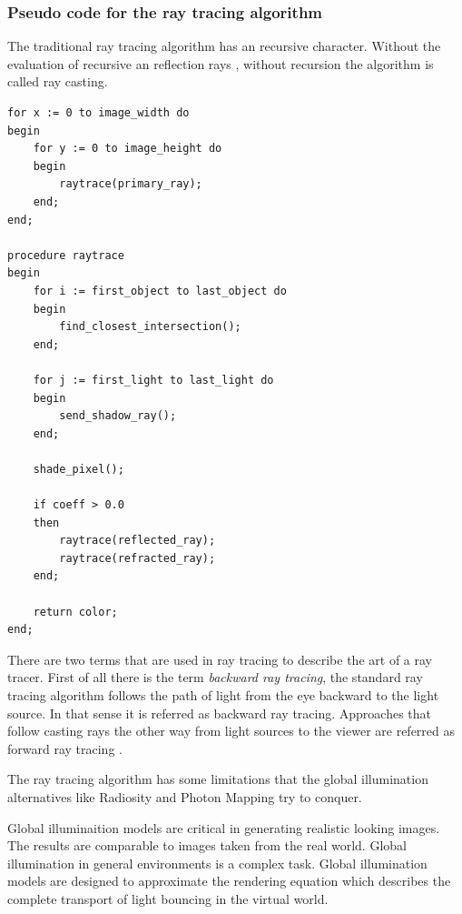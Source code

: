 \documentclass[DIV10, abstracton, openright, footsepline, headsepline, twoside, 9pt,
bigheadings]{scrreprt}
\begin{document}
\subsubsection*{Pseudo code for the ray tracing algorithm}
The traditional ray tracing algorithm has an recursive character. Without
the evaluation of recursive an reflection rays , without recursion the
algorithm is called ray casting.
\lstset{
        basicstyle=\ttfamily,
        tabsize=8,
        language=Pascal,
        numberstyle=\tiny,
        numbers=right,
        numbersep=5pt,
        stepnumber=1,
        extendedchars=true,
	basicstyle=\small
}
\begin{lstlisting}[caption=Ray tracing pseudo code]
for x := 0 to image_width do
begin
	for y := 0 to image_height do
	begin
		raytrace(primary_ray);
	end;
end;

procedure raytrace
begin
	for i := first_object to last_object do
	begin
		find_closest_intersection();
	end;

	for j := first_light to last_light do
	begin
		send_shadow_ray();
	end;

	shade_pixel();

	if coeff > 0.0
	then
		raytrace(reflected_ray);
		raytrace(refracted_ray);
	end;

	return color;
end;

\end{lstlisting}

There are two terms that are used in ray tracing to describe the art of a ray
tracer. First of all there is the term \textit{backward ray tracing}, the
standard ray tracing algorithm follows the path of light from the eye backward
to the light source. In that sense it is referred as backward ray tracing.
Approaches that follow casting rays the other way from light sources to the
viewer are referred as forward ray tracing \cite{Foley90}.

The ray tracing algorithm has some limitations that the global illumi\-nation
alternatives like Radiosity and Photon Mapping try to conquer.

Global illuminaition models are critical in generating realistic looking
images. The results are comparable to images taken from the real world.
Global illumination in general environments is a complex task. Global
illumination models are designed to approximate the rendering equation \cite
{Kajiya86} which describes the complete transport of light bouncing in the
virtual world.
\end{document}
